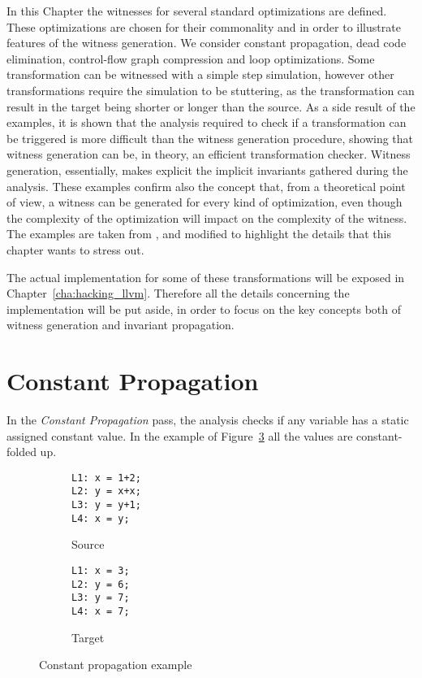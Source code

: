 
In this Chapter the witnesses for several standard optimizations are defined. These optimizations are chosen for their commonality and in order to illustrate features of the witness generation. We consider constant propagation, dead code elimination, control-flow graph compression and loop optimizations. Some transformation can be witnessed with a simple step simulation, however other transformations require the simulation to be stuttering, as the transformation can result in the target being shorter or longer than the source. As a side result of the examples, it is shown that the analysis required to check if a transformation can be triggered is more difficult than the witness generation procedure, showing that witness generation can be, in theory, an efficient transformation checker. Witness generation, essentially, makes explicit the implicit invariants gathered during the analysis. These examples confirm also the concept that, from a theoretical point of view, a witness can be generated for every kind of optimization, even though the complexity of the optimization will impact on the complexity of the witness. The examples are taken from \cite{zucknamjoshi}, and modified to highlight the details that this chapter wants to stress out.

The actual implementation for some of these transformations will be exposed in Chapter~\ref{cha:hacking_llvm}. Therefore all the details concerning the implementation will be put aside, in order to focus on the key concepts both of witness generation and invariant propagation.

\section{Constant Propagation}
\label{sec:constant_propagation_th}

In the \emph{Constant Propagation} pass, the analysis checks if any variable has a static assigned constant value. In the example of Figure~\ref{fig:constprop_th} all the values are constant-folded up.

\begin{figure}[t]
  \begin{mdframed}
  \centering
  \begin{subfigure}[t]{0.49\textwidth}
    \centering
    \begin{lstlisting}
L1: x = 1+2;
L2: y = x+x;
L3: y = y+1;
L4: x = y;
    \end{lstlisting}
    \caption{Source}
    \label{fig:sconstprop_th}
  \end{subfigure}
  \begin{subfigure}[t]{0.49\textwidth}
    \centering
    \begin{lstlisting}
L1: x = 3;
L2: y = 6;
L3: y = 7;
L4: x = 7;
    \end{lstlisting}
    \caption{Target}
    \label{fig:tconstprop_th}
  \end{subfigure}
  \end{mdframed}
  \caption{Constant propagation example}
  \label{fig:constprop_th}
\end{figure}

